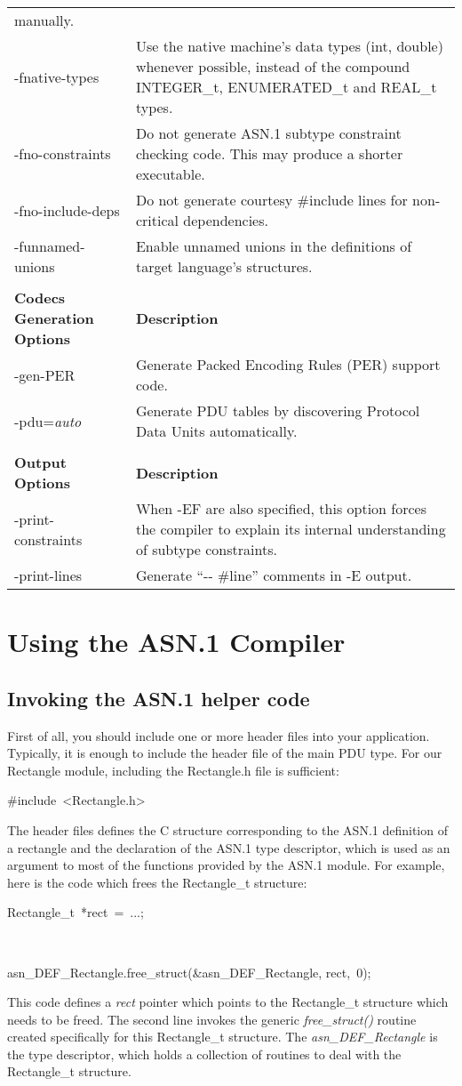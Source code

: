 \documentclass[english,oneside,12pt]{book}
\providecommand{\tabularnewline}{\\}
\newenvironment{lyxcode}
{\par\begin{list}{}{
\setlength{\rightmargin}{\leftmargin}
\setlength{\listparindent}{0pt}%
\raggedright
\setlength{\itemsep}{0pt}
\setlength{\parsep}{0pt}
\normalfont\ttfamily}%
 \item[]}
{\end{list}}
\begin{document}
\begin{longtable}{lp{4in}}
{manually. }\tabularnewline
{\small -fnative-types} & {\small Use the native machine's data types (int, double) whenever
possible, instead of the compound INTEGER\_t, ENUMERATED\_t and REAL\_t
types. }\tabularnewline
{\small -fno-constraints} & {\small Do not generate ASN.1 subtype constraint checking code. This
may produce a shorter executable.}\tabularnewline
{\small -fno-include-deps} & {\small Do not generate courtesy \#include lines for non-critical
dependencies.}\tabularnewline
{\small -funnamed-unions} & {\small Enable  unnamed  unions  in the definitions of target language's
structures.}\tabularnewline
\midrule\tabularnewline
\textbf{\small Codecs Generation Options} & \textbf{\small Description}\tabularnewline
\midrule
{\small -gen-PER} & {\small Generate Packed Encoding Rules (PER) support code.}\tabularnewline
{\small -pdu=}\emph{\small auto} & {\small Generate PDU tables by discovering Protocol Data Units automatically.}\tabularnewline
\midrule\tabularnewline
\textbf{\small Output Options} & \textbf{\small Description}\tabularnewline
\midrule
{\small -print-constraints} & {\small When -EF are also specified, this option forces the compiler
to explain its internal understanding of subtype constraints.}\tabularnewline
{\small -print-lines} & {\small Generate ``-{}- \#line'' comments
in -E output.}\tabularnewline
\bottomrule
\end{longtable}
\renewcommand{\arraystretch}{1}


\chapter{Using the ASN.1 Compiler}


\section[Invoking the helper code]{Invoking the ASN.1 helper code}

First of all, you should include one or more header files into your
application. Typically, it is enough to include the header file of
the main PDU type. For our Rectangle module, including the Rectangle.h
file is sufficient:
\begin{lyxcode}
\#include~<Rectangle.h>
\end{lyxcode}
The header files defines the C structure corresponding to the ASN.1
definition of a rectangle and the declaration of the ASN.1 type descriptor,
which is used as an argument to most of the functions provided by
the ASN.1 module. For example, here is the code which frees the Rectangle\_t
structure:
\begin{lyxcode}
Rectangle\_t~{*}rect~=~...;

~

asn\_DEF\_Rectangle.free\_struct(\&asn\_DEF\_Rectangle, rect,~0);
\end{lyxcode}
This code defines a \emph{rect} pointer which points to the Rectangle\_t
structure which needs to be freed. The second line invokes the generic
\emph{free\_struct()} routine created specifically for this Rectangle\_t
structure. The \emph{asn\_DEF\_Rectangle} is the type descriptor,
which holds a collection of routines to deal with the Rectangle\_t
structure.
\end{document}
